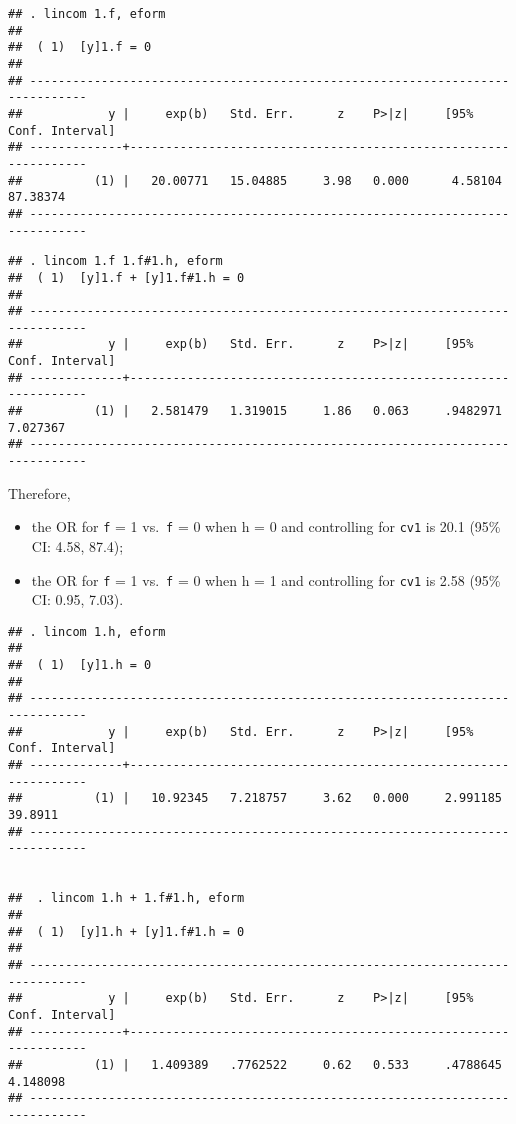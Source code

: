 \documentclass[
]{article}
\providecommand{\tightlist}{%
  \setlength{\itemsep}{0pt}\setlength{\parskip}{0pt}}
\begin{document}
\begin{verbatim}
## . lincom 1.f, eform
## 
##  ( 1)  [y]1.f = 0
## 
## ------------------------------------------------------------------------------
##            y |     exp(b)   Std. Err.      z    P>|z|     [95% Conf. Interval]
## -------------+----------------------------------------------------------------
##          (1) |   20.00771   15.04885     3.98   0.000      4.58104    87.38374
## ------------------------------------------------------------------------------
\end{verbatim}

\begin{verbatim}
## . lincom 1.f 1.f#1.h, eform
##  ( 1)  [y]1.f + [y]1.f#1.h = 0
## 
## ------------------------------------------------------------------------------
##            y |     exp(b)   Std. Err.      z    P>|z|     [95% Conf. Interval]
## -------------+----------------------------------------------------------------
##          (1) |   2.581479   1.319015     1.86   0.063     .9482971    7.027367
## ------------------------------------------------------------------------------
\end{verbatim}

Therefore,

\begin{itemize}
\tightlist
\item
  the OR for \texttt{f} = 1 vs.~\texttt{f} = 0 when h = 0 and
  controlling for \texttt{cv1} is 20.1 (95\% CI: 4.58, 87.4);
\item
  the OR for \texttt{f} = 1 vs.~\texttt{f} = 0 when h = 1 and
  controlling for \texttt{cv1} is 2.58 (95\% CI: 0.95, 7.03).
\end{itemize}

\begin{verbatim}
## . lincom 1.h, eform
## 
##  ( 1)  [y]1.h = 0
## 
## ------------------------------------------------------------------------------
##            y |     exp(b)   Std. Err.      z    P>|z|     [95% Conf. Interval]
## -------------+----------------------------------------------------------------
##          (1) |   10.92345   7.218757     3.62   0.000     2.991185     39.8911
## ------------------------------------------------------------------------------


##  . lincom 1.h + 1.f#1.h, eform
##
##  ( 1)  [y]1.h + [y]1.f#1.h = 0
##
## ------------------------------------------------------------------------------
##            y |     exp(b)   Std. Err.      z    P>|z|     [95% Conf. Interval]
## -------------+----------------------------------------------------------------
##          (1) |   1.409389   .7762522     0.62   0.533     .4788645    4.148098
## ------------------------------------------------------------------------------
\end{verbatim}
\end{document}
